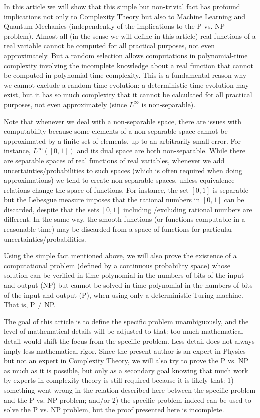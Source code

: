 \documentclass[11pt,a4paper]{report}
\begin{document}
In this article we will show that this simple but non-trivial fact has
profound implications not only to Complexity
Theory\cite{novak2008tractability}\cite{hennig2022probabilistic}\cite{ritter2000average}\cite{bna} but also to Machine
Learning\cite{hennig2022probabilistic} and Quantum Mechanics (independently of the
implications to the P vs. NP problem). Almost all (in the sense we will
define in this article) real functions of a real variable cannot be
computed for all practical purposes, not even approximately. But a
random selection allows computations in polynomial-time complexity
involving the incomplete knowledge about a real function that cannot be
computed in polynomial-time complexity. This is a fundamental reason why
we cannot exclude a random time-evolution: a deterministic
time-evolution may exist, but it has so much complexity that it cannot
be calculated for all practical purposes, not even approximately (since
\(L^\infty\) is non-separable).

Note that whenever we deal with a non-separable space, there are issues
with computability\cite{computable} because some elements of a non-separable space cannot be
approximated by a finite set of elements, up to an arbitrarily small
error. For instance, \(L^\infty([0,1])\) and its dual space are both
non-separable\cite{book}. While there
are separable spaces of real functions of real variables, whenever we
add uncertainties/probabilities to such spaces (which is often required
when doing approximations) we tend to create non-separable
spaces\cite{book}, unless equivalence
relations change the space of functions. For instance, the set \([0,1]\)
is separable but the Lebesgue measure imposes that the rational numbers
in \([0,1]\) can be discarded, despite that the sets \([0,1]\) including
/excluding rational numbers are different. In the same way, the smooth
functions (or functions computable in a reasonable time) may be
discarded from a space of functions for particular
uncertainties/probabilities.

Using the simple fact mentioned above, we will also prove the existence
of a computational problem (defined by a continuous probability space)
whose solution can be verified in time polynomial in the numbers of bits
of the input and output (NP) but cannot be solved in time polynomial in
the numbers of bits of the input and output (P), when using only a
deterministic Turing machine\cite{pvsnp}\cite{10.1145/322123.322138}. That is, P\(\neq\)NP.

The goal of this article is to define the specific problem
unambiguously, and the level of mathematical details will be adjusted to
that: too much mathematical detail would shift the focus from the
specific problem. Less detail does not always imply less mathematical
rigor. Since the present author is an expert in Physics but not an
expert in Complexity Theory, we will also try to prove the P vs. NP as
much as it is possible, but only as a secondary goal knowing that much
work by experts in complexity theory is still required because it is
likely that: 1) something went wrong in the relation described here
between the specific problem and the P vs. NP problem; and/or 2) the
specific problem indeed can be used to solve the P vs. NP problem, but
the proof presented here is incomplete.
\end{document}
